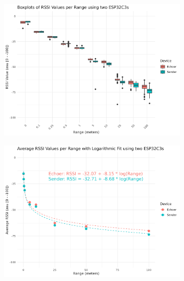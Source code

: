 \begin{figure}[ht]
    \centering
    \begin{subfigure}{0.45\textwidth}
        \includegraphics[width=\linewidth]{rstudio/analysis/plots/ESP32C3_rssi_box.png}
    \end{subfigure}
    \begin{subfigure}{0.45\textwidth}
        \includegraphics[width=\linewidth]{rstudio/analysis/plots/ESP32C3_avg_rssi.png}
    \end{subfigure}


\end{figure}
